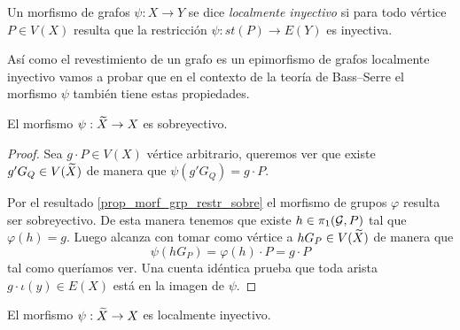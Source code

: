 \documentclass[tesis.tex]{subfiles}
\begin{document}
\begin{deff}
	Un morfismo de grafos $\psi:X \to Y$ se dice \emph{localmente inyectivo} si para todo vértice $P \in V(X)$ resulta que la restricción $\psi: st(P) \to E(Y)$ es inyectiva. 
\end{deff}

Así como el revestimiento de un grafo es un epimorfismo de grafos localmente inyectivo vamos a probar que en el contexto de la teoría de Bass--Serre el morfismo $\psi$ también tiene estas propiedades.

\begin{prop}\label{prop_psi_sobre}
	El morfismo $\psi: \widetilde X \to X$ es sobreyectivo.
\end{prop}
\begin{proof}
	Sea $g \cdot P \in V(X)$ vértice arbitrario, queremos ver que existe $g' G_{Q} \in V(\widetilde X)$ de manera que $\psi(g' G_{Q}) = g \cdot P$.
	
	Por el resultado \ref{prop_morf_grp_restr_sobre} el morfismo de grupos $\varphi$ resulta ser sobreyectivo.
	De esta manera tenemos que existe $h \in \pi_1({\cal G},P)$ tal que $\varphi(h) = g$. 
	Luego alcanza con tomar como vértice a $h G_P \in V(\widetilde X) $ de manera que 
	\[
	\psi(h G_P ) = \varphi(h) \cdot P = g \cdot P 
	\]
	tal como queríamos ver.
	Una cuenta idéntica prueba que toda arista $g \cdot \iota(y) \in E(X)$ está en la imagen de $\psi$. 
\end{proof}


\begin{prop}\label{prop_psi_loc_iny}
	El morfismo $\psi:\widetilde X \to X$ es localmente inyectivo.
\end{prop}
	
\end{document}
